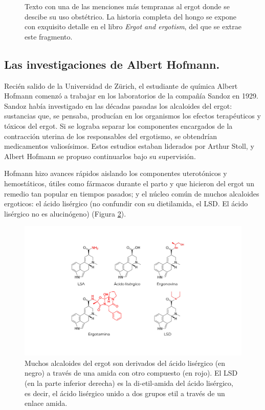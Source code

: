 \begin{figure}[H]
	\caption{Texto con una de las menciones más tempranas al ergot donde se descibe su uso obstétrico. La historia completa del hongo se expone con exquisito detalle en el libro \textit{Ergot and ergotism}, del que se extrae este fragmento.}
	\label{ergotbook}
\end{figure}

\subsection{Las investigaciones de Albert Hofmann.}

Recién salido de la Universidad de Zürich, el estudiante de química Albert Hofmann comenzó a trabajar en los laboratorios de la compañía Sandoz en 1929. Sandoz había investigado en las décadas pasadas los alcaloides del ergot: sustancias que, se pensaba, producían en los organismos los efectos terapéuticos y tóxicos del ergot. Si se lograba separar los componentes encargados de la contracción uterina de los responsables del ergotismo, se obtendrían medicamentos valiosísimos. Estos estudios estaban liderados por Arthur Stoll, y Albert Hofmann se propuso continuarlos bajo su supervisión.

Hofmann hizo avances rápidos aislando los componentes uterotónicos y hemostáticos, útiles como fármacos durante el parto y que hicieron del ergot un remedio tan popular en tiempos pasados; y el núcleo común de muchos alcaloides ergoticos: el ácido lisérgico (no confundir con su dietilamida, el LSD. El ácido lisérgico no es alucinógeno) (Figura \ref{alkaloids}).

\begin{figure}[H]
	\centering

	\includegraphics[width=\linewidth]{media/2-alkaloids.png}
	\caption{Muchos alcaloides del ergot son derivados del ácido lisérgico (en negro) a través de una amida con otro compuesto (en rojo). El LSD (en la parte inferior derecha) es la di-etil-amida del ácido lisérgico, es decir, el ácido lisérgico unido a dos grupos etil a través de un enlace amida.}
	\label{alkaloids}
\end{figure}

